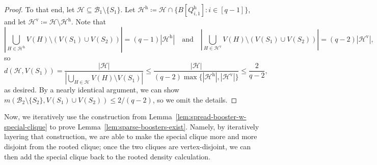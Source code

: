 \documentclass[11pt]{article}
\numberwithin{equation}{section}
\newcounter{i}
\theoremstyle{plain}
\theoremstyle{plain} %
\theoremstyle{definition}
\newcommand{\cB}{\mathcal{B}}
\newcommand{\cH}{\mathcal{H}}
\newcommand\hoclique{\ensuremath{\text{h}}}
\newcommand\vertclique{\ensuremath{{\text{v}}}}
\def\COMMENT#1{}
\begin{document}
\begin{proof}
    To that end, let $\cH \subseteq \cB_1\setminus\{S_1\}$.  Let $\cH^{\hoclique} \coloneqq \cH \cap \{B[Q^{\hoclique}_{i,1}] : i \in [q - 1]\}$, and let $\cH^{\vertclique} \coloneqq \cH\setminus \cH^{\hoclique}$.  Note that
    \begin{equation*}
        \left|\bigcup_{H\in\cH^{\hoclique}}V(H)\setminus (V(S_1) \cup V(S_2))\right| = (q - 1)|\cH^{\hoclique}| \quad\text{and}\quad \left|\bigcup_{H\in\cH^{\vertclique}}V(H)\setminus (V(S_1) \cup V(S_2))\right| = (q - 2)|\cH^{\vertclique}|,
    \end{equation*}
    so
    \begin{equation*}
        d(\cH, V(S_1)) = \frac{|\cH|}{\left|\bigcup_{H\in\cH}V(H)\setminus V(S_1)\right|} \leq \frac{|\cH|}{(q-2)\max\{|\cH^{\hoclique}|, |\cH^{\vertclique}|\}} \leq \frac{2}{q - 2},
    \end{equation*}
    as desired.
    By a nearly identical argument, we can show $m(\cB_2 \setminus \{S_2\}, V(S_1) \cup V(S_2)) \leq 2 / (q - 2)$, so we omit the details.\COMMENT{
    To that end, let $\cH \subseteq \cB_2\setminus\{S_2\}$.  Let $\cH^{\hoclique} \coloneqq \cH \cap \{B[Q^{\hoclique}_{i,2}] : i \in [q - 1]\}$, and let $\cH^{\vertclique} \coloneqq \cH\setminus \cH^{\hoclique}$.  Note that
    \begin{equation*}
        |\bigcup_{H\in\cH^{\hoclique}}V(H)\setminus (V(S_1) \cup V(S_2))| = (q - 1)|\cH^{\hoclique}| \quad\text{and}\quad |\bigcup_{H\in\cH^{\vertclique}}V(H)\setminus (V(S_1) \cup V(S_2))| = (q - 2)|\cH^{\vertclique}|,
    \end{equation*}
    so
    \begin{equation*}
        d(\cH, V(S_1)\cup V(S_2)) = \frac{|\cH|}{|\bigcup_{H\in\cH}V(H)\setminus (V(S_1) \cup V(S_2))|} \leq \frac{|\cH|}{(q-2)\max\{|\cH^{\hoclique}|, |\cH^{\vertclique}|\}} \leq \frac{2}{q - 2},
    \end{equation*}
    as desired.}
\end{proof}

Now, we iteratively use the construction from Lemma~\ref{lem:spread-booster-w-special-clique} to prove Lemma~\ref{lem:sparse-boosters-exist}. Namely, by iteratively layering that construction, we are able to make the special clique more and more disjoint from the rooted clique; once the two cliques are vertex-disjoint, we can then add the special clique back to the rooted density calculation.
\end{document}
